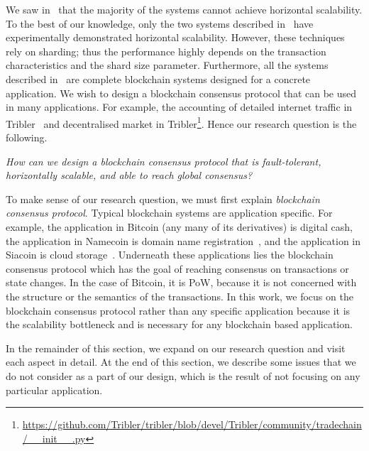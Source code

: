 We saw in~ that the majority of the systems cannot achieve horizontal scalability.
To the best of our knowledge, only the two systems described in~ have experimentally demonstrated horizontal scalability.
However, these techniques rely on sharding; thus the performance highly depends on the transaction characteristics and the shard size parameter.
Furthermore, all the systems described in~ are complete blockchain systems designed for a concrete application.
We wish to design a blockchain consensus protocol that can be used in many applications.
For example, the accounting of detailed internet traffic in Tribler~\cite{pouwelse2008tribler, multichain} and decentralised market in Tribler\footnote{\url{https://github.com/Tribler/tribler/blob/devel/Tribler/community/tradechain/__init__.py}}.
Hence our research question is the following.
\begin{displayquote}
\emph{How can we design a blockchain consensus protocol that is fault-tolerant,
horizontally scalable,
and able to reach global consensus?}
\end{displayquote}

To make sense of our research question, we must first explain \emph{blockchain consensus protocol}.
Typical blockchain systems are application specific.
For example, the application in Bitcoin (any many of its derivatives) is digital cash,
the application in Namecoin is domain name registration~\cite{namecoin},
and the application in Siacoin is cloud storage~\cite{siacoin}.
Underneath these applications lies the blockchain consensus protocol which has the goal of reaching consensus on transactions or state changes.
In the case of Bitcoin, it is PoW,
because it is not concerned with the structure or the semantics of the transactions.
In this work, we focus on the blockchain consensus protocol rather than any specific application because it is the scalability bottleneck and is necessary for any blockchain based application.

In the remainder of this section, we expand on our research question and visit each aspect in detail.
At the end of this section, we describe some issues that we do not consider as a part of our design,
which is the result of not focusing on any particular application.

